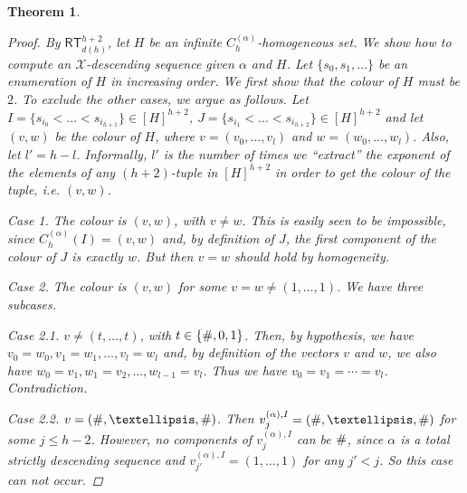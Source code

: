 \documentclass{amsart}
\newcommand\RT{\mathsf{RT}}
\newcommand{\LoX}{\mathcal{X}}
\newcommand\additionalsymbol{\text{\small{\#}}}
\newtheorem{theorem}{Theorem}
\begin{document}
\begin{theorem}
\begin{proof}
By $\RT^{h+2}_{d(h)}$, let $H$ be an infinite $C_h^{(\alpha)}$-homogeneous set. %
We show how to compute an $\LoX$-descending sequence given $\alpha$ and $H$. Let $\{s_0, s_1, \ldots\}$ be an enumeration of $H$ in increasing order.
We first show that the colour of $H$ must be $2$. To exclude the other cases, we argue as follows. %
Let $I = \{s_{i_0} < \ldots < s_{i_{h+1}}\} \in [H]^{h+2}$, $J = \{s_{i_1} < \ldots < s_{i_{h+2}}\} \in [H]^{h+2}$ and let $(v,w)$ be the colour of $H$, where $v = (v_0,\ldots,v_l)$ and $w = (w_0,\ldots, w_l)$. Also, let $l' = h-l$. Informally, $l'$ is the number of times we ``extract'' the exponent of the elements of any $(h+2)$-tuple in $[H]^{h+2}$ in order to get the colour of the tuple, i.e. $(v,w)$.

\smallskip
 
\emph{Case 1.} The colour is $(v,w)$, with $v \neq w$. This is easily seen to be impossible, since $C_h^{(\alpha)}(I)=(v,w)$ and, by definition of $J$, the first component of the colour of $J$ is exactly $w$. But then $v = w$ should hold by homogeneity.

\smallskip
 
\emph{Case 2.} The colour is $(v, w)$ for some $v = w \neq (1, \ldots, 1)$. We have three subcases.

\smallskip

\emph{Case 2.1.} $v \neq (t, \ldots, t)$, with $t \in \{\additionalsymbol, 0, 1\}$. Then, by hypothesis, we have $v_0=w_0, v_1=w_1, \ldots, v_l=w_l$ and, by definition of the vectors $v$ and $w$, we also have $w_0=v_1, w_1=v_2, \ldots, w_{l-1}=v_l$. Thus we have $v_0 = v_1 = \cdots = v_l$. Contradiction.

\smallskip
 
\emph{Case 2.2.} $v = (\additionalsymbol, \ldots, \additionalsymbol)$. Then $v_{j}^{(\alpha), I} = (\additionalsymbol, \ldots, \additionalsymbol)$ for some $j \leq h-2$. However, no components of $v_{j}^{(\alpha), I}$ can be $\additionalsymbol$, since $\alpha$ is a total strictly descending sequence and $v_{j'}^{(\alpha), I}\! = (1,\ldots,1)$ for any $j' < j$. So this case can not occur.


\end{proof}
\end{theorem}
\end{document}
